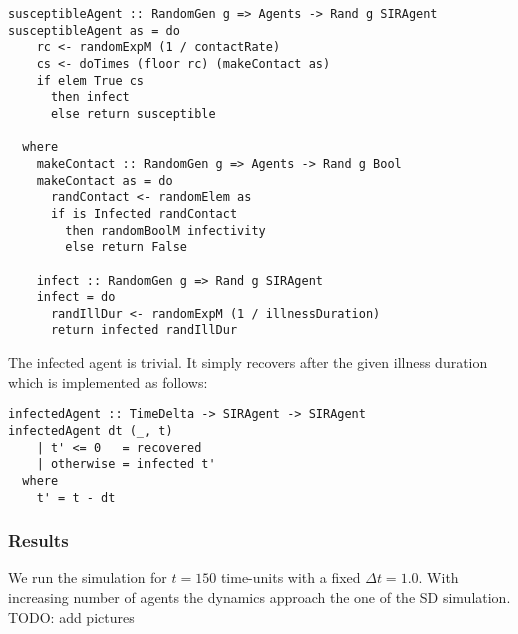 \begin{verbatim}
susceptibleAgent :: RandomGen g => Agents -> Rand g SIRAgent
susceptibleAgent as = do
    rc <- randomExpM (1 / contactRate)
    cs <- doTimes (floor rc) (makeContact as)
    if elem True cs
      then infect
      else return susceptible

  where
    makeContact :: RandomGen g => Agents -> Rand g Bool
    makeContact as = do
      randContact <- randomElem as
      if is Infected randContact
        then randomBoolM infectivity
        else return False

    infect :: RandomGen g => Rand g SIRAgent
    infect = do
      randIllDur <- randomExpM (1 / illnessDuration)
      return infected randIllDur
\end{verbatim}

The infected agent is trivial. It simply recovers after the given illness duration which is implemented as follows:

\begin{verbatim}
infectedAgent :: TimeDelta -> SIRAgent -> SIRAgent
infectedAgent dt (_, t) 
    | t' <= 0   = recovered
    | otherwise = infected t'
  where
    t' = t - dt  
\end{verbatim}

\subsubsection{Results}
We run the simulation for $t = 150$ time-units with a fixed $\Delta t = 1.0$. With increasing number of agents the dynamics approach the one of the SD simulation. TODO: add pictures

